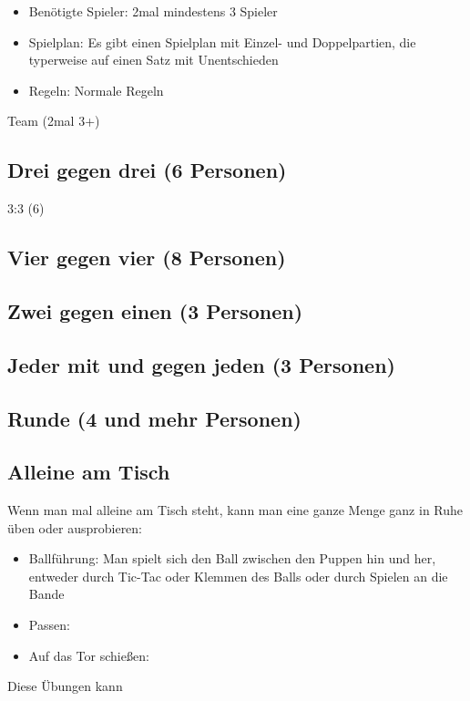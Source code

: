 \begin{itemize}
\item Benötigte Spieler: 2mal mindestens 3 Spieler
\item Spielplan: Es gibt einen Spielplan mit Einzel- und Doppelpartien, die typerweise auf einen Satz mit Unentschieden
\item Regeln: Normale Regeln 
\end{itemize}
 
Team (2mal 3+)

\subsection{Drei gegen drei (6 Personen)}
\label{spielformen:npersonen:dreigegendrei}
3:3 (6)

\subsection{Vier gegen vier (8 Personen)}
\label{spielformen:npersonen:viergegenvier}

\subsection{Zwei gegen einen (3 Personen)}
\label{spielformen:npersonen:zweigegeneinen}

\subsection{Jeder mit und gegen jeden (3 Personen)}
\label{spielformen:npersonen:jedergegenjeden}

\subsection{Runde (4 und mehr Personen)}
\label{spielformen:npersonen:runde}





\subsection{Alleine am Tisch}
\label{spielformen:npersonen:alleine}

Wenn man mal alleine am Tisch steht, kann man eine ganze Menge ganz in Ruhe üben oder ausprobieren:
\begin{itemize}
\item Ballführung: Man spielt sich den Ball zwischen den Puppen hin und her, entweder durch Tic-Tac oder Klemmen des Balls oder durch Spielen an die Bande 
\item Passen:
\item Auf das Tor schießen: 
\end{itemize}
Diese Übungen kann



